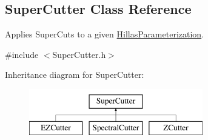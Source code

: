 \hypertarget{classSuperCutter}{
\subsection{SuperCutter Class Reference}
\label{classSuperCutter}
}


Applies SuperCuts to a given \hyperlink{structHillasParameterization}{HillasParameterization}.  




{\ttfamily \#include $<$SuperCutter.h$>$}

Inheritance diagram for SuperCutter:\begin{figure}[H]
\begin{center}
\leavevmode
\includegraphics[height=2.000000cm]{classSuperCutter}
\end{center}
\end{figure}
